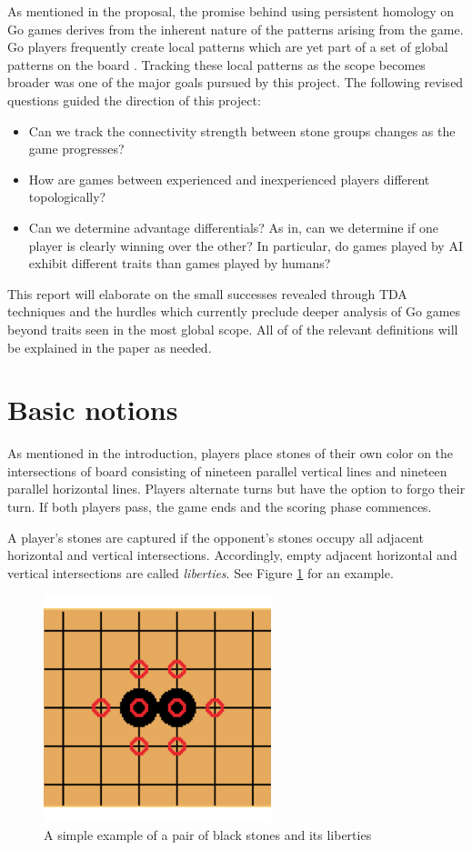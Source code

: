 \documentclass[12pt]{article}
\begin{document}
As mentioned in the proposal, the promise behind using persistent homology on Go games derives from the inherent nature of the patterns arising from the game. Go players frequently create local patterns which are yet part of a set of global patterns on the board \cite{bays}. Tracking these local patterns as the scope becomes broader was one of the major goals pursued by this project. The following revised questions guided the direction of this project:
\begin{itemize}
  \item Can we track the connectivity strength between stone groups changes as the game progresses?
  \item How are games between experienced and inexperienced players different topologically?
  \item Can we determine advantage differentials? As in, can we determine if one player is clearly winning over the other? In particular, do games played by AI exhibit different traits than games played by humans?
\end{itemize}

This report will elaborate on the small successes revealed through TDA techniques and the hurdles which currently preclude deeper analysis of Go games beyond traits seen in the most global scope. All of of the relevant definitions will be explained in the paper as needed.

\section{Basic notions}

As mentioned in the introduction, players place stones of their own color on the intersections of board consisting of nineteen parallel vertical lines and nineteen parallel horizontal lines. Players alternate turns but have the option to forgo their turn. If both players pass, the game ends and the scoring phase commences.

A player's stones are captured if the opponent's stones occupy all adjacent horizontal and vertical intersections. Accordingly, empty adjacent horizontal and vertical intersections are called \textit{liberties}. See Figure \ref{fig:lib1} for an example.
\begin{figure}[ht]
  \centering
  \includegraphics{lib1.png}
  \caption{A simple example of a pair of black stones and its liberties}
  \label{fig:lib1}
\end{figure}
\end{document}
